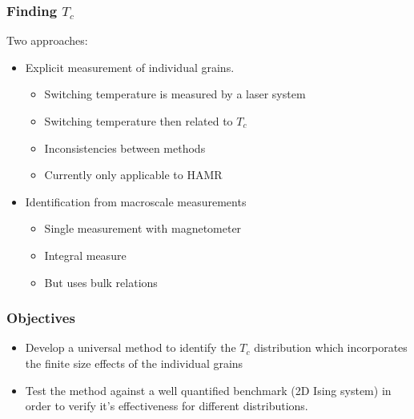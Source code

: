 \documentclass{beamer}
\begin{document}
\begin{frame}
	\frametitle{Finding $T_c$}
	Two approaches:
	\vspace{4mm}
	\begin{itemize}
		\item{Explicit measurement of individual grains.\footnotemark[3]}
		\begin{itemize}
			\item{Switching temperature is measured by a laser system} \item{Switching temperature then related to $T_c$}
			\item{Inconsistencies between methods}
			\item{Currently only applicable to HAMR}
		\end{itemize}
		\vspace{4mm}
		\item{Identification from macroscale measurements\footnotemark[4]}
		\begin{itemize}
			\item{Single measurement with magnetometer}
			\item{Integral measure}
			\item{But uses bulk relations}
		\end{itemize}
	\end{itemize}
\end{frame}

\begin{frame}
	\frametitle{Objectives}
	\begin{itemize}
		\item{Develop a universal method to identify the $T_c$ distribution which incorporates the finite size effects of the individual grains\newline}
		\item{Test the method against a well quantified benchmark (2D Ising system) in order to verify it's effectiveness for different distributions.\newline}
	\end{itemize}
\end{frame}
\end{document}
